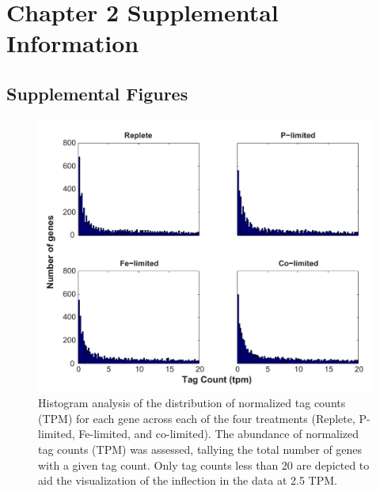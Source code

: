 
\chapter{Chapter 2 Supplemental Information}

\raggedbottom




\clearpage
\section{Supplemental Figures}
\begin{figure}[h!]
  \centering
    \includegraphics[width=1\textwidth]{Images/C2_FigureS1_v6.pdf}
    \caption[Distribution of normalized tag counts across treatments]{Histogram analysis of the distribution of normalized tag counts (TPM) for each gene across each of the four treatments (Replete, P-limited, Fe-limited, and co-limited). The abundance of normalized tag counts (TPM) was assessed, tallying the total number of genes with a given tag count. Only tag counts less than 20 are depicted to aid the visualization of the inflection in the data at 2.5 TPM.}
  \label{fig:a1f1}
\end{figure}

